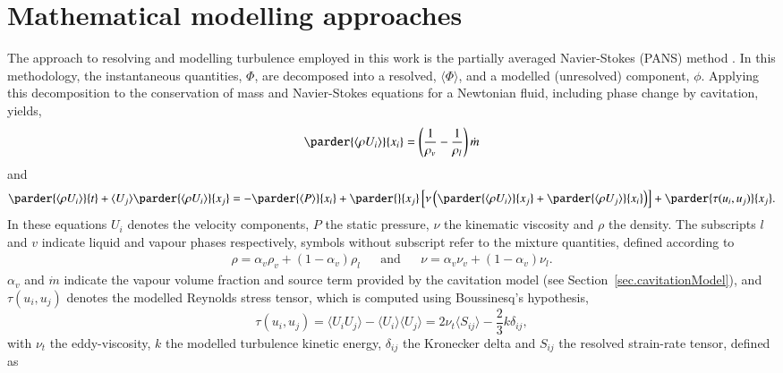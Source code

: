 \documentclass[a4paper,10pt,preprint,3p]{elsarticle}
\begin{document}
\section{Mathematical modelling approaches}
\label{sec.turbulenceModels}
The approach to resolving and modelling turbulence employed in this work is the partially averaged Navier-Stokes (PANS) method \cite{girimaji2005partially}. In this methodology, the instantaneous quantities, $\Phi$, are decomposed into a resolved, $\langle\Phi\rangle$, and a modelled (unresolved) component, $\phi$. Applying this decomposition to the conservation of mass and Navier-Stokes equations for a Newtonian fluid, including phase change by cavitation, yields,
\begin{equation}\label{eq.continuity}
	\parder{\langle \rho U_i\rangle}{x_i} = \left(\frac{1}{\rho_v} - \frac{1}{\rho_l}\right) \dot{m}
\end{equation}
and
\begin{equation}
\parder{\langle \rho U_i \rangle}{t} + \langle U_j \rangle \parder{\langle \rho U_i \rangle}{x_j} = -\parder{\langle P \rangle}{x_i} + \parder{}{x_j} \left[\nu \left(\parder{\langle \rho U_i \rangle}{x_j} + \parder{\langle \rho U_j \rangle}{x_i}\right)\right]  + \parder{\tau(u_i,u_j)}{x_j}.
\end{equation}
In these equations $U_i$ denotes the velocity components, $P$ the static pressure, $\nu$ the kinematic viscosity and $\rho$ the density. The subscripts $l$ and $v$ indicate liquid and vapour phases respectively, symbols without subscript refer to the mixture quantities, defined according to
\begin{align}\label{eq.mixtureProperties}
\rho = \alpha_v \rho_v + \left(1-\alpha_v\right) \rho_l && \mathrm{and} && \nu = \alpha_v \nu_v + \left(1-\alpha_v\right) \nu_l.
\end{align}
$\alpha_v$ and $\dot{m}$ indicate the vapour volume fraction and source term provided by the cavitation model (see Section~\ref{sec.cavitationModel}), and $\tau (u_i,u_j)$ denotes the modelled Reynolds stress tensor, which is computed using Boussinesq's hypothesis,
\begin{equation}\label{eq.Boussinesq}
\tau (u_i,u_j) = \langle U_i U_j \rangle - \langle U_i \rangle \langle U_j \rangle = 2 \nu_t \langle S_{ij} \rangle - \frac{2}{3} k \delta_{ij},
\end{equation}
with $\nu_t$ the eddy-viscosity, $k$ the modelled turbulence kinetic energy, $\delta_{ij}$ the Kronecker delta and $S_{ij}$ the resolved strain-rate tensor, defined as
\end{document}
